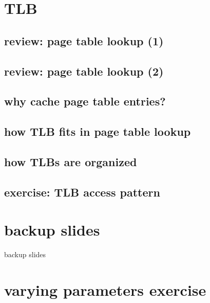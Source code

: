 \section{TLB}

\subsection{review: page table lookup (1)}


\subsection{review: page table lookup (2)}

\subsection{why cache page table entries?}


\subsection{how TLB fits in page table lookup}


\subsection{how TLBs are organized}

\subsection{exercise: TLB access pattern}




\section{backup slides}
\begin{frame}{backup slides}
\end{frame}

\section{varying parameters exercise}





